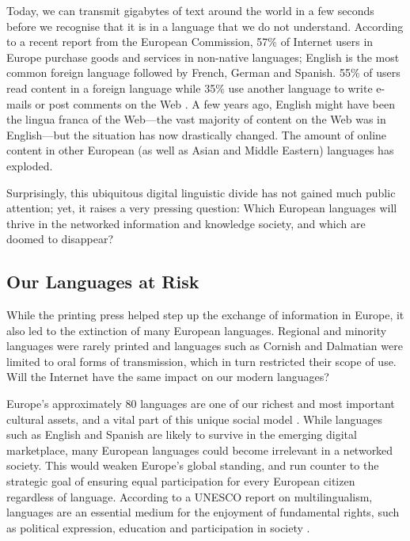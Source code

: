 \begin{multicols}{2}
Today, we can transmit gigabytes of text around the world in a few seconds before we recognise that it is in a language that we do not understand. According to a recent report from the European Commission, 57\% of Internet users in Europe purchase goods and services in non-native languages; English is the most common foreign language followed by French, German and Spanish. 55\% of users read content in a foreign language while 35\% use another language to write e-mails or post comments on the Web \cite{EC1}. A few years ago, English might have been the lingua franca of the Web—the vast majority of content on the Web was in English—but the situation has now drastically changed. The amount of online content in other European (as well as Asian and Middle Eastern) languages has exploded.

Surprisingly, this ubiquitous digital linguistic divide has not gained much public attention; yet, it raises a very pressing question: Which European languages will thrive in the networked information and knowledge society, and which are doomed to disappear?

\subsection{Our Languages at Risk}

While the printing press helped step up the exchange of information in Europe, it also led to the extinction of many European languages. Regional and minority languages were rarely printed and languages such as Cornish and Dalmatian were limited to oral forms of transmission, which in turn restricted their scope of use. Will the Internet have the same impact on our modern languages?

Europe’s approximately 80 languages are one of our richest and most important cultural assets, and a vital part of this unique social model \cite{EC2}. While languages such as English and Spanish are likely to survive in the emerging digital marketplace, many European languages could become irrelevant in a networked society. This would weaken Europe’s global standing, and run counter to the strategic goal of ensuring equal participation for every European citizen regardless of language. According to a UNESCO report on multilingualism, languages are an essential medium for the enjoyment of fundamental rights, such as political expression, education and participation in society \cite{Unesco1}.



\end{multicols}
